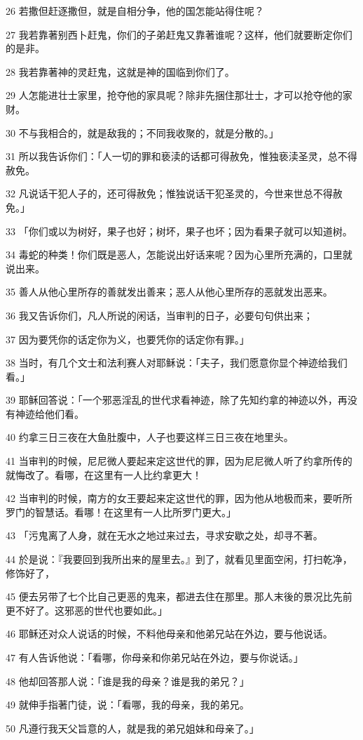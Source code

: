 \par 26 若撒但赶逐撒但，就是自相分争，他的国怎能站得住呢？
\par 27 我若靠著别西卜赶鬼，你们的子弟赶鬼又靠著谁呢？这样，他们就要断定你们的是非。
\par 28 我若靠著神的灵赶鬼，这就是神的国临到你们了。
\par 29 人怎能进壮士家里，抢夺他的家具呢？除非先捆住那壮士，才可以抢夺他的家财。
\par 30 不与我相合的，就是敌我的；不同我收聚的，就是分散的。」
\par 31 所以我告诉你们：「人一切的罪和亵渎的话都可得赦免，惟独亵渎圣灵，总不得赦免。
\par 32 凡说话干犯人子的，还可得赦免；惟独说话干犯圣灵的，今世来世总不得赦免。」
\par 33 「你们或以为树好，果子也好；树坏，果子也坏；因为看果子就可以知道树。
\par 34 毒蛇的种类！你们既是恶人，怎能说出好话来呢？因为心里所充满的，口里就说出来。
\par 35 善人从他心里所存的善就发出善来；恶人从他心里所存的恶就发出恶来。
\par 36 我又告诉你们，凡人所说的闲话，当审判的日子，必要句句供出来；
\par 37 因为要凭你的话定你为义，也要凭你的话定你有罪。」
\par 38 当时，有几个文士和法利赛人对耶稣说：「夫子，我们愿意你显个神迹给我们看。」
\par 39 耶稣回答说：「一个邪恶淫乱的世代求看神迹，除了先知约拿的神迹以外，再没有神迹给他们看。
\par 40 约拿三日三夜在大鱼肚腹中，人子也要这样三日三夜在地里头。
\par 41 当审判的时候，尼尼微人要起来定这世代的罪，因为尼尼微人听了约拿所传的就悔改了。看哪，在这里有一人比约拿更大！
\par 42 当审判的时候，南方的女王要起来定这世代的罪，因为他从地极而来，要听所罗门的智慧话。看哪！在这里有一人比所罗门更大。」
\par 43 「污鬼离了人身，就在无水之地过来过去，寻求安歇之处，却寻不著。
\par 44 於是说：『我要回到我所出来的屋里去。』到了，就看见里面空闲，打扫乾净，修饰好了，
\par 45 便去另带了七个比自己更恶的鬼来，都进去住在那里。那人末後的景况比先前更不好了。这邪恶的世代也要如此。」
\par 46 耶稣还对众人说话的时候，不料他母亲和他弟兄站在外边，要与他说话。
\par 47 有人告诉他说：「看哪，你母亲和你弟兄站在外边，要与你说话。」
\par 48 他却回答那人说：「谁是我的母亲？谁是我的弟兄？」
\par 49 就伸手指著门徒，说：「看哪，我的母亲，我的弟兄。
\par 50 凡遵行我天父旨意的人，就是我的弟兄姐妹和母亲了。」

